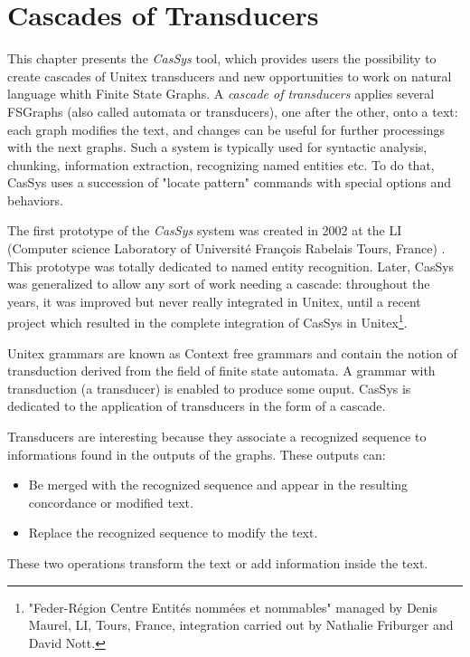 \chapter{Cascades of Transducers}
\label{chap-cassys}

This chapter presents the \textit{CasSys} tool, which provides users the possibility to create cascades of Unitex transducers and new opportunities to work on natural language whith Finite State Graphs. A \textit{cascade of transducers}  applies several FSGraphs (also called automata or transducers), one after the other, onto a text: each graph modifies the text, and changes can be useful for further processings with the next graphs. Such a system is typically used for syntactic analysis, chunking, information extraction, recognizing named entities etc. To do that, CasSys uses a succession of "locate pattern" commands with special options and behaviors.

\bigskip
\noindent The first prototype of the \textit{CasSys}  system was created in 2002 at the LI 
(Computer science Laboratory of Université François Rabelais Tours, France) \cite{these-nathalie}. This prototype was totally  dedicated to named entity recognition. Later, CasSys was generalized to allow any sort of work needing a cascade: throughout the years,  it was improved but never really integrated in Unitex, until a recent project which resulted in the complete integration of CasSys in Unitex\footnote{"Feder-Région Centre Entités  nommées et nommables" managed by Denis Maurel, LI, Tours, France, integration carried out by Nathalie Friburger and David Nott.}.

\bigskip
\noindent Unitex grammars are known as Context free grammars and contain the notion of transduction derived from the field 
of finite state automata. A grammar with transduction (a transducer) is enabled to produce some ouput. 
CasSys is dedicated to the application of transducers in the form of a cascade.

\bigskip
\noindent Transducers are interesting because they associate a recognized sequence to informations found in the outputs of the graphs. 
These outputs can:
\begin{itemize}
	\item	Be merged with the recognized sequence and appear in the resulting concordance or modified text. 
	\item	Replace the recognized sequence to modify the text. 
\end{itemize}
\noindent These two operations transform the text or add information inside the text. 


